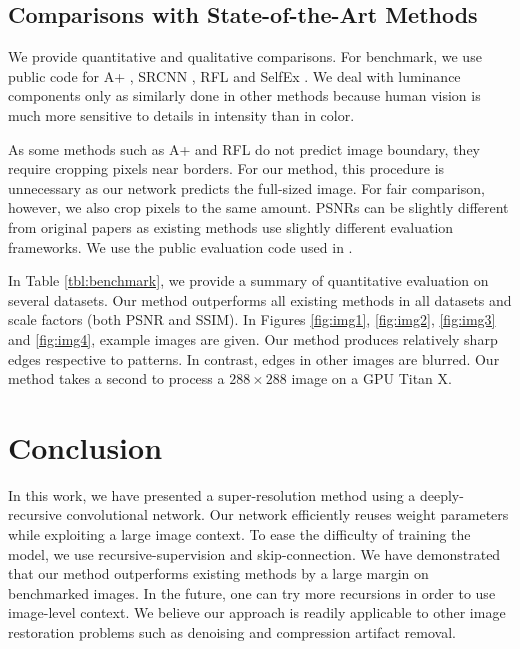 \documentclass[10pt,twocolumn,letterpaper]{article}
\begin{document}
\subsection{Comparisons with State-of-the-Art Methods}
We provide quantitative and qualitative comparisons. For benchmark, we use public code for A+ \cite{Timofte}, SRCNN \cite{dong2014image}, RFL \cite{schulter2015fast} and  SelfEx \cite{Huang-CVPR-2015}. We deal with luminance components only as similarly done in other methods because human vision is much more sensitive to details in intensity than in color.

As  some methods such as A+ \cite{Timofte} and  RFL \cite{schulter2015fast} do not predict image boundary, they require cropping pixels near borders. For our method, this procedure is unnecessary as our network predicts the full-sized image. For fair comparison, however, we also crop pixels to the same amount. PSNRs can be slightly different from original papers as existing methods use slightly different evaluation frameworks. We use the public evaluation code used in \cite{Huang-CVPR-2015}.

In Table \ref{tbl:benchmark}, we provide a summary of quantitative evaluation on several datasets. 
Our method outperforms all existing methods in all datasets and scale factors (both PSNR and SSIM). In Figures \ref{fig:img1}, \ref{fig:img2}, \ref{fig:img3} and \ref{fig:img4}, example images are given. Our method produces relatively sharp edges respective to patterns. In contrast, edges in other images are blurred. Our method takes a second to process a $288 \times 288$ image on a GPU Titan X.

\section{Conclusion}
In this work, we have presented a super-resolution method using a deeply-recursive convolutional network. Our network efficiently reuses weight parameters while exploiting a large image context. To ease the difficulty of training the model, we use recursive-supervision and skip-connection. We have demonstrated that our method outperforms existing methods by a large margin on benchmarked images. In the future, one can try more recursions in order to use image-level context. We believe our approach is readily applicable to other image restoration problems such as denoising and compression artifact removal.

{\small
	
	
}
\end{document}
